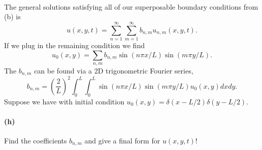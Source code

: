 \documentclass{article}
\begin{document}
\phline
\paragraph{}
The general solutions satisfying all of our superposable boundary conditions from (b) is
	\begin{equation*}
		u(x,y,t) = \sum_{n=1}^{\infty}\sum_{m=1}^{\infty} b_{n,m}u_{n,m}(x,y,t).
	\end{equation*}
If we plug in the remaining condition we find
	\begin{equation*}
		u_{0}(x,y) = \sum_{n,m} b_{n,m}\sin(n\pi x/L)\sin(m\pi y/L).
	\end{equation*}
The $b_{n,m}$ can be found via a 2D trigonometric Fourier series,
	\begin{equation*}
		b_{n,m} = \left(\frac{2}{L}\right)^{2}\int_{0}^{L}\int_{0}^{L}\sin(n\pi  x/L)\sin(m\pi y/L)u_{0}(x,y)dxdy.
	\end{equation*}
Suppose we have with initial condition $u_{0}(x,y) = \delta(x-L/2)\delta(y-L/2)$.

\paragraph{(h)}
Find the coefficients $b_{n,m}$ and give a final form for $u(x,y,t)$!
\end{document}
